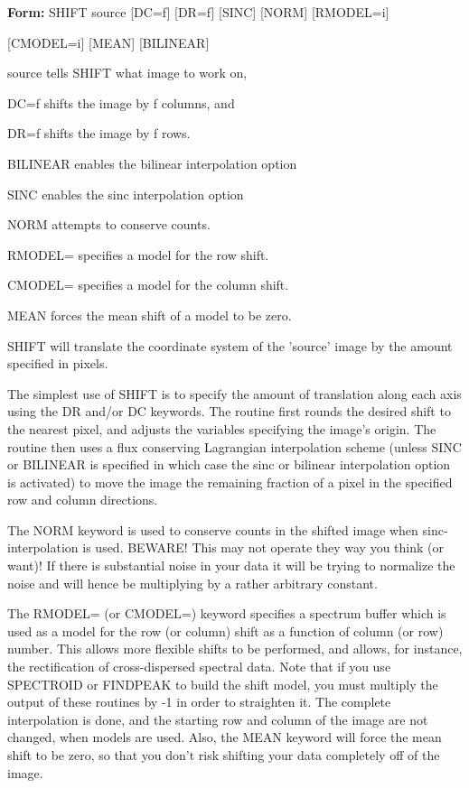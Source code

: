 \begin{command}
  \item[\textbf{Form: }SHIFT source {[DC=f]} {[DR=f]} {[SINC]} {[NORM]} 
       {[RMODEL=i]}\hfill]{}
  \item[]{{[CMODEL=i]} {[MEAN]} {[BILINEAR]}}
  \item[source]{tells SHIFT what image to work on,}
  \item[DC=f]{shifts the image by f columns, and}
  \item[DR=f]{shifts the image by f rows.}
  \item[BILINEAR]{enables the bilinear interpolation option}
  \item[SINC]{enables the sinc interpolation option}
  \item[NORM]{attempts to conserve counts.}
  \item[RMODEL=]{specifies a model for the row shift.}
  \item[CMODEL=]{specifies a model for the column shift.}
  \item[MEAN]{forces the mean shift of a model to be zero.}
\end{command}

SHIFT will translate the coordinate system of the 'source' image by 
the amount specified in pixels.  

The simplest use of SHIFT is to specify the amount of translation along
each axis using the DR and/or DC keywords.  The routine first rounds the
desired shift to the nearest pixel, and adjusts the variables specifying
the image's origin. The routine then uses a flux conserving Lagrangian
interpolation scheme (unless SINC or BILINEAR is specified in which case
the sinc or bilinear interpolation option is activated) to move the image
the remaining fraction of a pixel in the specified row and column
directions.

The NORM keyword is used to conserve counts in the shifted image when sinc-
interpolation is used.  BEWARE! This may not operate they way you think (or
want)!  If there is substantial noise in your data it will be trying to
normalize the noise and will hence be multiplying by a rather arbitrary
constant.

The RMODEL= (or CMODEL=) keyword specifies a spectrum buffer which is used
as a model for the row (or column) shift as a function of column (or row)
number.  This allows more flexible shifts to be performed, and allows, for
instance, the rectification of cross-dispersed spectral data.  Note that if
you use SPECTROID or FINDPEAK to build the shift model, you must multiply
the output of these routines by -1 in order to straighten it.  The complete
interpolation is done, and the starting row and column of the image are not
changed, when models are used.  Also, the MEAN keyword will force the mean
shift to be zero, so that you don't risk shifting your data completely off
of the image.


